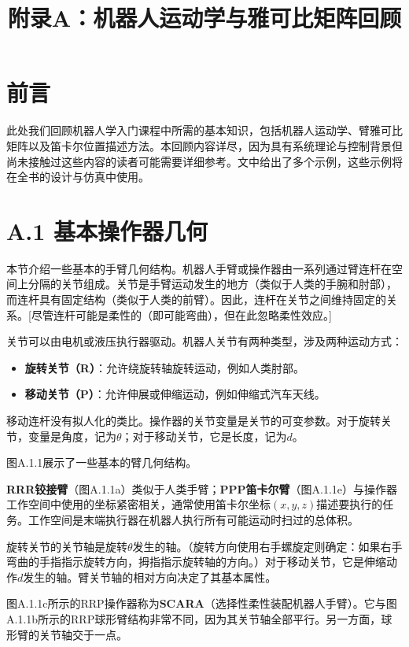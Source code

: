 \documentclass[UTF8,a4paper]{ctexart}
\title{附录A：机器人运动学与雅可比矩阵回顾}
\date{}
\begin{document}
\maketitle

\section*{前言}

此处我们回顾机器人学入门课程中所需的基本知识，包括机器人运动学、臂雅可比矩阵以及笛卡尔位置描述方法。本回顾内容详尽，因为具有系统理论与控制背景但尚未接触过这些内容的读者可能需要详细参考。文中给出了多个示例，这些示例将在全书的设计与仿真中使用。

\section{A.1 基本操作器几何}

本节介绍一些基本的手臂几何结构。机器人手臂或操作器由一系列通过臂连杆在空间上分隔的关节组成。关节是手臂运动发生的地方（类似于人类的手腕和肘部），而连杆具有固定结构（类似于人类的前臂）。因此，连杆在关节之间维持固定的关系。[尽管连杆可能是柔性的（即可能弯曲），但在此忽略柔性效应。]

关节可以由电机或液压执行器驱动。机器人关节有两种类型，涉及两种运动方式：
\begin{itemize}
    \item \textbf{旋转关节（R）}：允许绕旋转轴旋转运动，例如人类肘部。
    \item \textbf{移动关节（P）}：允许伸展或伸缩运动，例如伸缩式汽车天线。
\end{itemize}

移动连杆没有拟人化的类比。操作器的关节变量是关节的可变参数。对于旋转关节，变量是角度，记为$\theta$；对于移动关节，它是长度，记为$d$。

图A.1.1展示了一些基本的臂几何结构。

\textbf{RRR铰接臂}（图A.1.1a）类似于人类手臂；\textbf{PPP笛卡尔臂}（图A.1.1e）与操作器工作空间中使用的坐标紧密相关，通常使用笛卡尔坐标$(x, y, z)$描述要执行的任务。工作空间是末端执行器在机器人执行所有可能运动时扫过的总体积。

旋转关节的关节轴是旋转$\theta$发生的轴。（旋转方向使用右手螺旋定则确定：如果右手弯曲的手指指示旋转方向，拇指指示旋转轴的方向。）对于移动关节，它是伸缩动作$d$发生的轴。臂关节轴的相对方向决定了其基本属性。

图A.1.1c所示的RRP操作器称为\textbf{SCARA}（选择性柔性装配机器人手臂）。它与图A.1.1b所示的RRP球形臂结构非常不同，因为其关节轴全部平行。另一方面，球形臂的关节轴交于一点。
\end{document}
